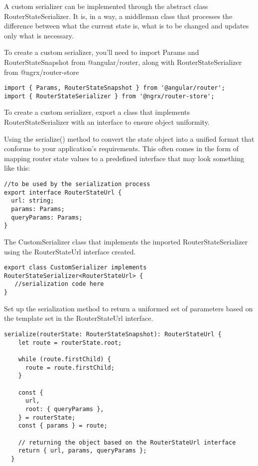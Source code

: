 A custom serializer can be implemented through the abstract class
RouterStateSerializer. It is, in a way, a middleman class that processes the
difference between what the current state is, what is to be changed and updates
only what is necessary.

To create a custom serializer, you’ll need to import Params and
RouterStateSnapshot from @angular/router, along with RouterStateSerializer from
@ngrx/router-store
\begin{verbatim}
import { Params, RouterStateSnapshot } from '@angular/router';
import { RouterStateSerializer } from '@ngrx/router-store';
\end{verbatim}

To create a custom serializer, export a class that implements
RouterStateSerializer with an interface to ensure object uniformity.

Using the serialize() method to convert the state object into a unified format
that conforms to your application’s requirements. This often comes in the form
of mapping router state values to a predefined interface that may look something
like this:

\begin{lstlisting}
//to be used by the serialization process
export interface RouterStateUrl {
  url: string;
  params: Params;
  queryParams: Params;
}
\end{lstlisting}

The CustomSerializer class that implements the imported RouterStateSerializer
using the RouterStateUrl interface created.

\begin{lstlisting}
export class CustomSerializer implements RouterStateSerializer<RouterStateUrl> {
   //serialization code here
}
\end{lstlisting}

Set up the serialization method to return a uniformed set of parameters based
on the template set in the RouterStateUrl interface.

\begin{lstlisting}
serialize(routerState: RouterStateSnapshot): RouterStateUrl {
    let route = routerState.root;

    while (route.firstChild) {
      route = route.firstChild;
    }

    const {
      url,
      root: { queryParams },
    } = routerState;
    const { params } = route;

    // returning the object based on the RouterStateUrl interface
    return { url, params, queryParams };
  }

\end{lstlisting}

